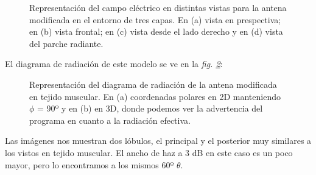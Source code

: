 \begin{figure}[!htb]
    \caption{Representación del campo eléctrico en distintas vistas para la antena modificada en el entorno de tres capas. En (a) vista en prespectiva; en (b) vista frontal; en (c) vista desde el lado derecho y en (d) vista del parche radiante.}
    \label{fig:fig5.34}
\end{figure}

\clearpage

El diagrama de radiación de este modelo se ve en la \textit{fig. \ref{fig:fig5.35}}:

\begin{figure}[!htb]
    \centering
    \caption{Representación del diagrama de radiación de la antena modificada en tejido muscular. En (a) coordenadas polares en 2D manteniendo $\phi$ = 90º y en (b) en 3D, donde podemos ver la advertencia del programa en cuanto a la radiación efectiva.}
    \label{fig:fig5.35}
\end{figure}

Las imágenes nos muestran dos lóbulos, el principal y el posterior muy similares a los vistos en tejido muscular. El ancho de haz a 3 dB en este caso es un poco mayor, pero lo encontramos a los mismos 60º $\theta$.


